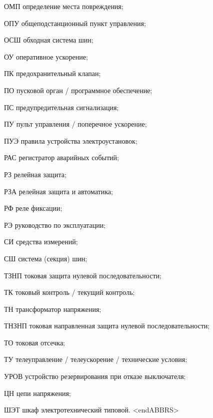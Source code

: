 \begin{list}{}
\item[ОМП] определение места повреждения;
\item[ОПУ] общеподстанционный пункт управления;
\item[ОСШ] обходная система шин;
\item[ОУ] оперативное ускорение;
\item[ПК] предохранительный клапан;
\item[ПО] пусковой орган / программное обеспечение;
\item[ПС] предупредительная сигнализация;
\item[ПУ] пульт управления / поперечное ускорение;
\item[ПУЭ] правила устройства электроустановок;
\item[РАС] регистратор аварийных событий;
\item[РЗ] релейная защита;
\item[РЗА] релейная защита и автоматика;
\item[РФ] реле фиксации;
\item[РЭ] руководство по эксплуатации;
\item[СИ] средства измерений;
\item[СШ] система (секция) шин;
\item[ТЗНП] токовая защита нулевой последовательности;
\item[ТК] токовый контроль / текущий контроль;
\item[ТН] трансформатор напряжения;
\item[ТНЗНП] токовая направленная защита нулевой последовательности;
\item[ТО] токовая отсечка;
\item[ТУ] телеуправление / телеускорение / технические условия;
\item[УРОВ] устройство резервирования при отказе выключателя;
\item[ЦН] цепи напряжения;
\item[ШЭТ] шкаф электротехнический типовой.
{\color{white}\fontsize{0.1pt}{0.1pt}\selectfont<endABBRS>}
\end{list}
